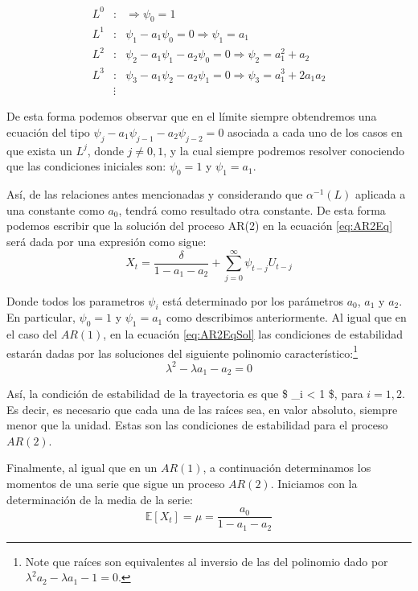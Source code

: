 \documentclass[
]{book}
\begin{document}
\begin{eqnarray*}
  L^0 & : & \Rightarrow \psi_0 = 1 \\
  L^1 & : & \psi_1 - a_1 \psi_0 = 0 \Rightarrow \psi_1 = a_1 \\
  L^2 & : & \psi_2 - a_1 \psi_1 - a_2 \psi_0 = 0 \Rightarrow \psi_2 = a^2_1 + a_2 \\
  L^3 & : & \psi_3 - a_1 \psi_2 - a_2 \psi_1 = 0 \Rightarrow \psi_3 = a^3_1 + 2 a_1 a_2 \\
  & \vdots & 
\end{eqnarray*}

De esta forma podemos observar que en el límite siempre obtendremos una ecuación del tipo \(\psi_j - a_1 \psi_{j-1} - a_2 \psi_{j-2} = 0\) asociada a cada uno de los casos en que exista un \(L^j\), donde \(j \neq 0, 1\), y la cual siempre podremos resolver conociendo que las condiciones iniciales son: \(\psi_0 = 1\) y \(\psi_1 = a_1\).

Así, de las relaciones antes mencionadas y considerando que \(\alpha^{-1} (L)\) aplicada a una constante como \(a_0\), tendrá como
resultado otra constante. De esta forma podemos escribir que la solución del proceso AR(2) en la ecuación \eqref{eq:AR2Eq} será dada por una expresión como sigue:
\begin{equation}
    X_t = \frac{\delta}{1 - a_1 - a_2} + \sum^{\infty}_{j = 0} \psi_{t - j} U_{t - j}
    \label{eq:AR2EqSol}
\end{equation}

Donde todos los parametros \(\psi_i\) está determinado por los parámetros \(a_0\), \(a_1\) y \(a_2\). En particular, \(\psi_0 = 1\) y \(\psi_1 = a_1\) como describimos anteriormente. Al igual que en el caso del \(AR(1)\), en la ecuación \eqref{eq:AR2EqSol} las condiciones de estabilidad estarán dadas por las soluciones del siguiente polinomio característico:\footnote{Note que raíces son equivalentes al inversio de las del polinomio dado por $\lambda^2 a_2 - \lambda a_1 - 1 = 0$.}
\begin{equation}
    \lambda^2 - \lambda a_1 - a_2 = 0
\end{equation}

Así, la condición de estabilidad de la trayectoria es que \$ \textbar{} \lambda\_i \textbar{} \textless{} 1 \$, para \(i = 1, 2\). Es decir, es necesario que cada
una de las raíces sea, en valor absoluto, siempre menor que la unidad. Estas son las condiciones de estabilidad para el proceso \(AR(2)\).

Finalmente, al igual que en un \(AR(1)\), a continuación determinamos los momentos de una serie que sigue un proceso \(AR(2)\). Iniciamos con la determinación de la media de la serie:
\begin{equation}
    \mathbb{E}[X_t] = \mu = \frac{a_0}{1 - a_1 - a_2}
\end{equation}
\end{document}
